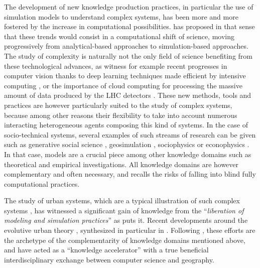 The development of new knowledge production practices, in particular the use of simulation models to understand complex systems, has been more and more fostered by the increase in computational possibilities. \cite{arthur2015complexity} has proposed in that sense that these trends would consist in a computational shift of science, moving progressively from analytical-based approaches to simulation-based approaches. The study of complexity is naturally not the only field of science benefiting from these technological advances, as witness for example recent progresses in computer vision thanks to deep learning techniques made efficient by intensive computing \cite{lecun2015deep}, or the importance of cloud computing for processing the massive amount of data produced by the LHC detectors \cite{bird2011computing}. These new methods, tools and practices are however particularly suited to the study of complex systems, because among other reasons their flexibility to take into account numerous interacting heterogeneous agents composing this kind of systems. In the case of socio-technical systems, several examples of such streams of research can be given such as generative social science \cite{epstein2006generative}, geosimulation \cite{benenson2004geosimulation}, sociophysics \cite{galam2008sociophysics} or econophysics \cite{mantegna1999introduction}. In that case, models are a crucial piece among other knowledge domains \cite{raimbault2017applied} such as theoretical and empirical investigations. All knowledge domains are however complementary and often necessary, and \cite{raimbault2016cautious} recalls the risks of falling into blind fully computational practices.

The study of urban systems, which are a typical illustration of such complex systems \cite{batty2007cities}, has witnessed a significant gain of knowledge from the ``\textit{liberation of modeling and simulation practices}'' as \cite{banos2013pour} puts it. Recent developments around the evolutive urban theory \cite{pumain1997pour}, synthesized in particular in \cite{pumain2017urban}. Following \cite{banos2017knowledge}, these efforts are the archetype of the complementarity of knowledge domains mentioned above, and have acted as a ``knowledge accelerator'' with a true beneficial interdisciplinary exchange between computer science and geography.

